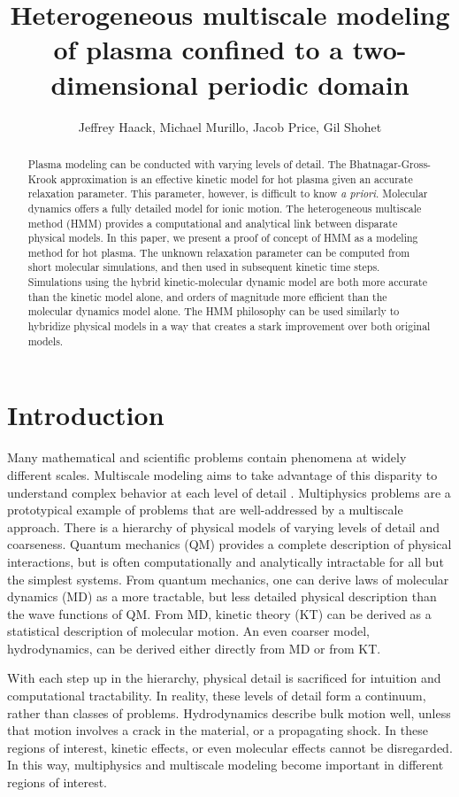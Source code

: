\documentclass{article}
\title{Heterogeneous multiscale modeling of plasma confined to a two-dimensional periodic domain}
\author{Jeffrey Haack, Michael Murillo, Jacob Price, Gil Shohet}
\begin{document}
\maketitle

\begin{abstract}
Plasma modeling can be conducted with varying levels of detail. The Bhatnagar-Gross-Krook approximation is an effective kinetic model for hot plasma given an accurate relaxation parameter. This parameter, however, is difficult to know \emph{a priori}. Molecular dynamics offers a fully detailed model for ionic motion. The heterogeneous multiscale method (HMM) provides a computational and analytical link between disparate physical models. In this paper, we present a proof of concept of HMM as a modeling method for hot plasma. The unknown relaxation parameter can be computed from short molecular simulations, and then used in subsequent kinetic time steps. Simulations using the hybrid kinetic-molecular dynamic model are both more accurate than the kinetic model alone, and orders of magnitude more efficient than the molecular dynamics model alone. The HMM philosophy can be used similarly to hybridize physical models in a way that creates a stark improvement over both original models.
\end{abstract}

\section{Introduction}

Many mathematical and scientific problems contain phenomena at widely different scales. Multiscale modeling aims to take advantage of this disparity to understand complex behavior at each level of detail \cite{weinan2011principles}. Multiphysics problems are a prototypical example of problems that are well-addressed by a multiscale approach. There is a hierarchy of physical models of varying levels of detail and coarseness. Quantum mechanics (QM) provides a complete description of physical interactions, but is often computationally and analytically intractable for all but the simplest systems. From quantum mechanics, one can derive laws of molecular dynamics (MD) as a more tractable, but less detailed physical description than the wave functions of QM. From MD, kinetic theory (KT) can be derived as a statistical description of molecular motion. An even coarser model, hydrodynamics, can be derived either directly from MD or from KT.

With each step up in the hierarchy, physical detail is sacrificed for intuition and computational tractability. In reality, these levels of detail form a continuum, rather than classes of problems. Hydrodynamics describe bulk motion well, unless that motion involves a crack in the material, or a propagating shock. In these regions of interest, kinetic effects, or even molecular effects cannot be disregarded. In this way, multiphysics and multiscale modeling become important in different regions of interest.
\end{document}

